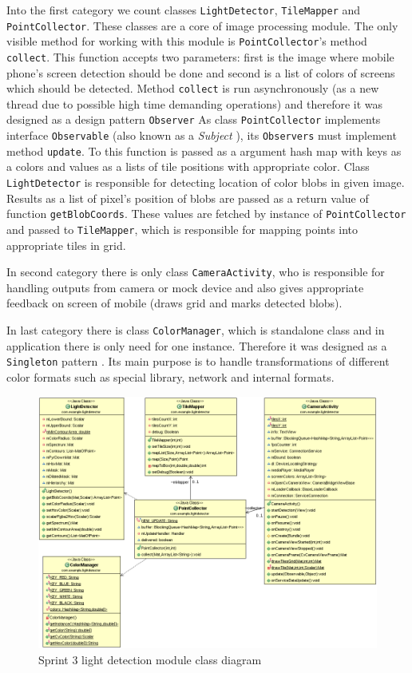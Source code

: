 Into the first category we count classes \texttt{LightDetector}, \texttt{TileMapper} and \texttt{PointCollector}. 
These classes are a core of image processing module. 
The only visible method for working with this module is \texttt{PointCollector}'s method \texttt{collect}.
This function accepts two parameters: first is the image where mobile phone's screen detection should be done and second is a list of colors of screens which should be detected. 
Method \texttt{collect} is run asynchronously (as a new thread due to possible high time demanding operations) and therefore it was designed as a design pattern \texttt{Observer}
As class \texttt{PointCollector} implements interface \texttt{Observable} (also known as a \emph{Subject} \cite[p.~326]{Gamma:1995:DPE:186897}), its \texttt{Observers} must implement method \texttt{update}. 
To this function is passed as a argument hash map with keys as a colors and values as a lists of tile positions with appropriate color.
Class \texttt{LightDetector} is responsible for detecting location of color blobs in given image. 
Results as a list of pixel's position of blobs are passed as a return value of function \texttt{getBlobCoords}. 
These values are fetched by instance of \texttt{PointCollector} and passed to \texttt{TileMapper}, which is responsible for mapping points into appropriate tiles in grid.

In second category there is only class \texttt{CameraActivity}, who is responsible for handling outputs from camera or mock device and also gives appropriate feedback on screen of mobile (draws grid and marks detected blobs).

In last category there is class \texttt{ColorManager}, which is standalone class and in application there is only need for one instance. Therefore it was designed as a \texttt{Singleton} pattern \cite[p.~144]{Gamma:1995:DPE:186897}. Its main purpose is to handle transformations of different color formats such as special library, network and internal formats.

\begin{figure}[h]
	\centering
		\includegraphics[width=16.2cm]{sprint3/sprint3.png}
	\caption{Sprint 3 light detection module class diagram}
	\label{fig:class_diagram_sprint3}
\end{figure}

